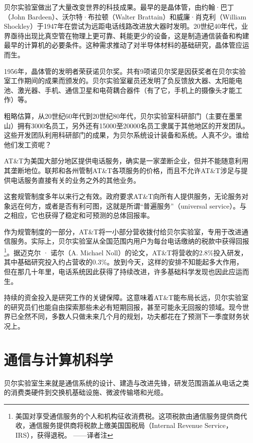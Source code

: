 \documentclass[a4paper,12pt,UTF8,twoside]{ctexbook}
\begin{document}
贝尔实验室做出了大量改变世界的科技成果。最早的是晶体管，由约翰·巴丁（John Bardeen）、沃尔特·布拉顿（Walter Brattain）和威廉·肖克利（William Shockley）于1947年在尝试为远距电话线路改进放大器时发明。20世纪40年代，业界亟待出现比真空管在物理上更可靠、耗能更少的设备，这是制造通信装备和构建最早的计算机的必要条件。这种需求推动了对半导体材料的基础研究，晶体管应运而生。

1956年，晶体管的发明者荣获诺贝尔奖。共有9项诺贝尔奖是因获奖者在贝尔实验室工作期间的成果而颁发的。贝尔实验室雇员还发明了负反馈放大器、太阳能电池、激光器、手机、通信卫星和电荷耦合器件（有了它，手机上的摄像头才能工作）等。

粗略估算，从20世纪60年代到20世纪80年代，贝尔实验室科研部门（主要在墨里山）拥有3000名员工，另外还有15000至20000名员工隶属于其他地区的开发团队。这些开发团队利用科研部门的成果，为贝尔系统设计装备和系统。人真不少。谁给他们发工资呢？

AT\&T为美国大部分地区提供电话服务，确实是一家垄断企业，但并不能随意利用其垄断地位。联邦和各州管制AT\&T各项服务的价格，而且不允许AT\&T涉足与提供电话服务直接有关的业务之外的其他业务。

这套规管制度多年以来行之有效。政府要求AT\&T向所有人提供服务，无论服务对象远在何方，或者是否有利可图，这就是所谓“普遍服务”（universal service）。与之相应，它也获得了稳定和可预测的总体回报率。

作为规管制度的一部分，AT\&T将一小部分营收拨付给贝尔实验室，专用于改进通信服务。实际上，贝尔实验室从全国范围内用户为每台电话缴纳的税款中获得回报\footnote{美国对享受通信服务的个人和机构征收消费税。这项税款由通信服务提供商代收，通信服务提供商将税款上缴美国国税局（Internal Revenue Service，IRS），获得退税。 ——译者注}。据迈克尔 · 诺尔（A. Michael Noll）的论文，AT\&T将营收的2.8\%投入研发，其中基础研究投入约占营收的0.3\%。放到今天，这样的安排不知能起多大作用，但在那几十年里，电话系统因此获得了持续改进，许多基础科学发现也因此应运而生。

持续的资金投入是研究工作的关键保障。这意味着AT\&T能布局长远，贝尔实验室的研究员们也能自由探索那些未必有短期回报，甚至可能永无回报的领域。现今世界已全然不同，多数人只做未来几个月的规划，功夫都花在了预测下一季度财务状况上。

\section{通信与计算机科学}

贝尔实验室生来就是通信系统的设计、建造与改进先锋，研发范围涵盖从电话之类的消费类硬件到交换机基础设施、微波传输塔和光缆。
\end{document}
